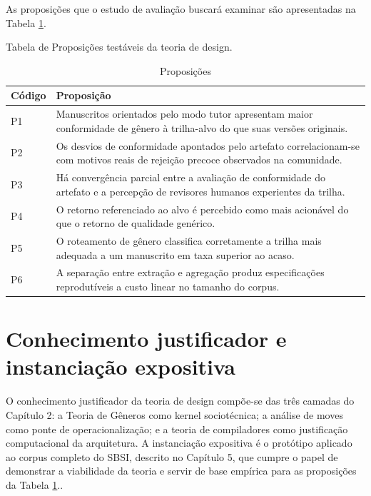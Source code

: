 As proposições que o estudo de avaliação buscará examinar são apresentadas na Tabela \ref{tab:proposicoes}.

Tabela de Proposições testáveis da teoria de design.

\begin{table}[H]
\centering
\caption{Proposições}
\label{tab:proposicoes}
\small
\begin{tabular}{l p{11.5cm}}
\toprule
Código & Proposição \\
\midrule
P1 & Manuscritos orientados pelo modo tutor apresentam maior conformidade de gênero à trilha-alvo do que suas versões originais. \\
P2 & Os desvios de conformidade apontados pelo artefato correlacionam-se com motivos reais de rejeição precoce observados na comunidade. \\
P3 & Há convergência parcial entre a avaliação de conformidade do artefato e a percepção de revisores humanos experientes da trilha. \\
P4 & O retorno referenciado ao alvo é percebido como mais acionável do que o retorno de qualidade genérico. \\
P5 & O roteamento de gênero classifica corretamente a trilha mais adequada a um manuscrito em taxa superior ao acaso. \\
P6 & A separação entre extração e agregação produz especificações reprodutíveis a custo linear no tamanho do corpus. \\
\bottomrule
\end{tabular}
\end{table}

\section{Conhecimento justificador e instanciação expositiva}

O conhecimento justificador da teoria de design compõe-se das três camadas do Capítulo 2: a Teoria de Gêneros como kernel sociotécnica; a análise de moves como ponte de operacionalização; e a teoria de compiladores como justificação computacional da arquitetura. A instanciação expositiva é o protótipo aplicado ao corpus completo do SBSI, descrito no Capítulo 5, que cumpre o papel de demonstrar a viabilidade da teoria e servir de base empírica para as proposições da Tabela \ref{tab:proposicoes}..